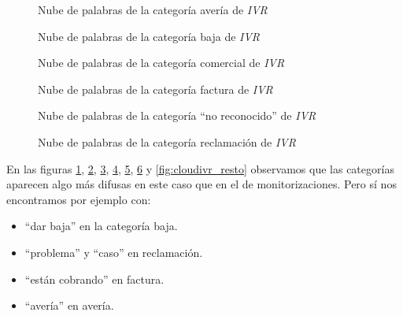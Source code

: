 \begin{figure}[!ht]
	\centering
    \caption{Nube de palabras de la categoría avería de \textit{IVR}}
    \label{fig:cloudivr_ave}
\end{figure} 


\begin{figure}[!ht]
	\centering
    \caption{Nube de palabras de la categoría baja de \textit{IVR}}
    \label{fig:cloudivr_baja}
\end{figure} 

\begin{figure}[!ht]
	\centering
    \caption{Nube de palabras de la categoría comercial de \textit{IVR}}
    \label{fig:cloudivr_comercial}
\end{figure} 

\begin{figure}[!ht]
	\centering
    \caption{Nube de palabras de la categoría factura de \textit{IVR}}
    \label{fig:cloudivr_factura}
\end{figure} 

\begin{figure}[!ht]
	\centering
    \caption{Nube de palabras de la categoría ``no reconocido'' de \textit{IVR}}
    \label{fig:cloudivr_nrec}
\end{figure} 

\begin{figure}[!ht]
	\centering
    \caption{Nube de palabras de la categoría reclamación de \textit{IVR}}
    \label{fig:cloudivr_recl}
\end{figure} 


  
  
  
    
En las figuras  \ref{fig:cloudivr_ave}, \ref{fig:cloudivr_baja}, \ref{fig:cloudivr_comercial}, \ref{fig:cloudivr_factura}, \ref{fig:cloudivr_nrec}, \ref{fig:cloudivr_recl} y \ref{fig:cloudivr_resto}  observamos que las  categorías aparecen algo más difusas en este caso que en el de
monitorizaciones. Pero sí nos encontramos por ejemplo con:
\begin{itemize}
\item  ``dar baja'' en la categoría baja.

\item ``problema'' y ``caso'' en reclamación.

\item ``están cobrando'' en factura.

\item ``avería'' en avería.

\end{itemize}


